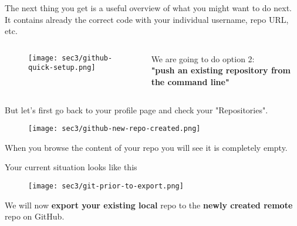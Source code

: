 \begin{frame}[fragile]
\emptyframetitle

  The next thing you get is a useful overview of what you might want to do next. It contains already the correct code with your individual username, repo URL, etc.

  \begin{columns}
  \begin{column}{0.6\textwidth}
    \begin{figure}[h]
      \texttt{[image: sec3/github-quick-setup.png]}
    \end{figure}
  \end{column}
  \begin{column}{0.4\textwidth}
    \vspace*{3.25cm}
    We are going to do option 2:\\ \textbf{"push an existing repository from the command line"}
  \end{column}
  \end{columns}

\end{frame}


\begin{frame}[fragile]
\emptyframetitle

  But let's first go back to your profile page and check your "Repositories".\\[0.25cm]

  \begin{figure}[h]
    \texttt{[image: sec3/github-new-repo-created.png]}
  \end{figure}

  When you browse the content of your repo you will see it is completely empty.

\end{frame}


\begin{frame}[fragile]
\emptyframetitle

  Your current situation looks like this

  \begin{figure}[h]
    \texttt{[image: sec3/git-prior-to-export.png]}
  \end{figure}

  We will now \textbf{export your existing local} repo to the \textbf{newly created remote} repo on GitHub.

\end{frame}


